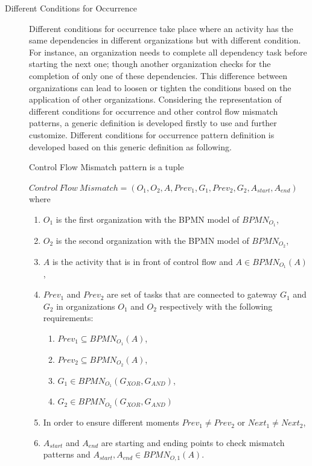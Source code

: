 \begin{description}
	\item[Different Conditions for Occurrence] Different conditions for occurrence take place where an activity has the same dependencies in different organizations but with different condition. For instance, an organization needs to complete all dependency task before starting the next one; though another organization checks for the completion of only one of these dependencies. This difference between organizations can lead to loosen or tighten the conditions based on the application of other organizations. Considering the representation of different conditions for occurrence and other control flow mismatch patterns, a generic definition is developed firstly to use and further customize. Different conditions for occurrence pattern definition is developed based on this generic definition as following.
		\theoremstyle{definition}
		\begin{definition}
		Control Flow Mismatch pattern is a tuple 

		${Control\ Flow\ Mismatch} = (O_{1}, O_{2}, A, Prev_{1}, G_{1}, Prev_{2}, G_{2}, A_{start}, A_{end}) $ where 
		\begin{enumerate}
		  \item $O_{1}$ is the first organization with the BPMN model of $BPMN_{{O}_{1}}$,
		  \item $O_{2}$ is the second organization with the BPMN model of $BPMN_{{O}_{2}}$,
		  \item $A$ is the activity that is in front of control flow and $A \in BPMN_{{O}_{1}}(A)$,
		  \item $Prev_{1}$ and $Prev_{2}$ are set of tasks that are connected to gateway $G_{1}$ and $G_{2}$ in organizations $O_{1}$ and $O_{2}$ respectively with the following requirements:
			  \begin{enumerate}
				  \item $Prev_{1} \subseteq BPMN_{{O}_{1}}(A)$,
				  \item $Prev_{2} \subseteq BPMN_{{O}_{2}}(A)$,
				  \item $G_{1} \in BPMN_{{O}_{1}}(G_{XOR}, G_{AND})$,
	  			  \item $G_{2} \in BPMN_{{O}_{2}}(G_{XOR}, G_{AND})$
			  \end {enumerate}
  		  \item In order to ensure different moments $Prev_{1} \neq Prev_{2}$ or $Next_{1} \neq Next_{2}$,
 		  \item $A_{start}$ and $A_{end}$ are starting and ending points to check mismatch patterns and $A_{start}, A_{end} \in BPMN_{O,1}(A)$.
		\end{enumerate}
		\end{definition}


\end{description}
